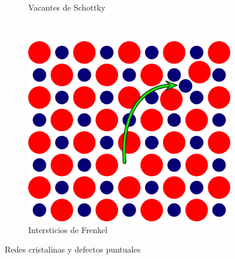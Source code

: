 \documentclass[a4paper,11pt]{article}
\begin{document}
\begin{figure}[b]
\begin{subfigure}[b]{0.3\textwidth}
        \caption{Vacantes de Schottky}
        \label{fig:schottky}
    \end{subfigure}
    ~
    \begin{subfigure}[b]{0.27\textwidth}
        \includegraphics[width=\textwidth]{figs/frenkel.png}
        \caption{Intersticios de Frenkel}
        \label{fig:frenkel}
    \end{subfigure}
    \caption{Redes cristalinas y defectos puntuales}
\end{figure}
\end{document}
